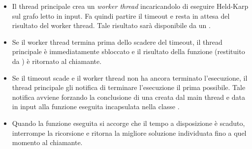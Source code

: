\begin{itemize}
    \item Il thread principale crea un \textit{worker thread} incaricandolo di eseguire Held-Karp sul grafo letto in input. Fa quindi partire il timeout e resta in attesa del risultato del worker thread. Tale risultato sarà disponibile da un .
    \item Se il worker thread termina prima dello scadere del timeout, il thread principale è immediatamente sbloccato e il risultato della funzione (restituito da ) è ritornato al chiamante.
    \item Se il timeout scade e il worker thread non ha ancora terminato l'esecuzione, il thread principale gli notifica di terminare l'esecuzione il prima possibile. Tale notifica avviene forzando la conclusione di una  creata dal main thread e data in input alla funzione eseguita incapsulata nella classe .
    \item Quando la funzione eseguita si accorge che il tempo a disposizione è scaduto, interrompe la ricorsione e ritorna la migliore soluzione individuata fino a quel momento al chiamante. 
\end{itemize}
